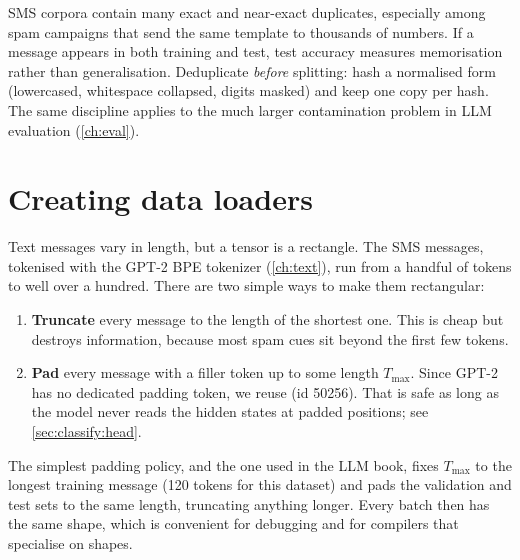 \begin{pitfall}
SMS corpora contain many exact and near-exact duplicates, especially among spam
campaigns that send the same template to thousands of numbers. If a message appears in
both training and test, test accuracy measures memorisation rather than generalisation.
Deduplicate \emph{before} splitting: hash a normalised form (lowercased, whitespace
collapsed, digits masked) and keep one copy per hash. The same discipline applies to the
much larger contamination problem in LLM evaluation (\cref{ch:eval}).
\end{pitfall}

\section{Creating data loaders}\label{sec:classify:loaders}

Text messages vary in length, but a tensor is a rectangle. The SMS messages, tokenised
with the GPT-2 BPE tokenizer (\cref{ch:text}), run from a handful of tokens to well over
a hundred. There are two simple ways to make them rectangular:

\begin{enumerate}
\item \textbf{Truncate} every message to the length of the shortest one. This is cheap
but destroys information, because most spam cues sit beyond the first few tokens.
\item \textbf{Pad} every message with a filler token up to some length $T_{\max}$. Since
GPT-2 has no dedicated padding token, we reuse  (id 50256). That is
safe as long as the model never reads the hidden states at padded positions; see
\cref{sec:classify:head}.
\end{enumerate}

The simplest padding policy, and the one used in the LLM book, fixes $T_{\max}$ to the
longest training message (120 tokens for this dataset) and pads the validation and test
sets to the same length, truncating anything longer. Every batch then has the same
shape, which is convenient for debugging and for compilers that specialise on shapes.


